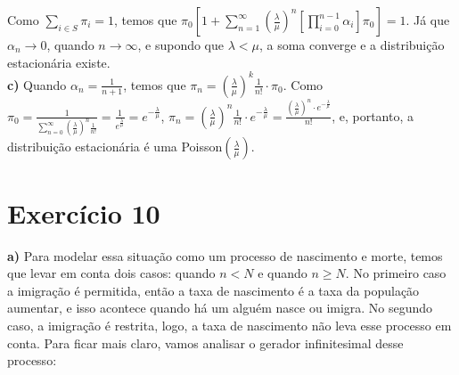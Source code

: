 \documentclass[12pt]{article}
\begin{document}
	Como $ \sum_{i \in S} \pi_i = 1 $, temos que $ \pi_0 \left[1 + \sum_{n=1}^{\infty} \left(\frac{\lambda}{\mu}\right)^n \left[\prod_{i=0}^{n-1} \alpha_{i}\right] \pi_0\right] = 1 $. Já que $ \alpha_n \to 0 $, quando $ n \to \infty$, e supondo que $ \lambda < \mu $, a soma converge e a distribuição estacionária existe. \\
	
	\textbf{c)} Quando $ \alpha_n = \frac{1}{n+1} $, temos que $ \pi_n = \left(\frac{\lambda}{\mu}\right)^k \frac{1}{n!} \cdot \pi_0 $. Como $ \pi_0 = \frac{1}{\sum_{n=0}^{\infty}\left(\frac{\lambda}{\mu}\right)^n \frac{1}{n!}} = \frac{1}{e^{\frac{\lambda}{\mu}}} = e^{-\frac{\lambda}{\mu}}$, $ \pi_n = \left(\frac{\lambda}{\mu}\right)^n \frac{1}{n!} \cdot e^{-\frac{\lambda}{\mu}} = \frac{\left(\frac{\lambda}{\mu}\right)^n \cdot e^{-\frac{\lambda}{\mu}}}{n!}$, e, portanto, a distribuição estacionária é uma Poisson$ \left(\frac{\lambda}{\mu}\right) $.
	
	\section*{Exercício 10}
	
	\textbf{a)} Para modelar essa situação como um processo de nascimento e morte, temos que levar em conta dois casos: quando $ n < N $ e quando $ n \geq N $. No primeiro caso a imigração é permitida, então a taxa de nascimento é a taxa da população aumentar, e isso acontece quando há um alguém nasce ou imigra. No segundo caso, a imigração é restrita, logo, a taxa de nascimento não leva esse processo em conta. Para ficar mais claro, vamos analisar o gerador infinitesimal desse processo:
	
\end{document}
